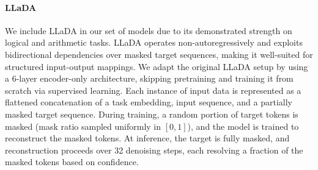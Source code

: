 \paragraph{LLaDA}
We include LLaDA \citep{Nie_LLaDA_2025} in our set of models due to its demonstrated strength on logical and arithmetic tasks. LLaDA operates non-autoregressively and exploits bidirectional dependencies over masked target sequences, making it well-suited for structured input-output mappings. We adapt the original LLaDA setup by using a 6-layer encoder-only architecture, skipping pretraining and training it from scratch via supervised learning. Each instance of input data is represented as a flattened concatenation of a task embedding, input sequence, and a partially masked target sequence. During training, a random portion of target tokens is masked (mask ratio sampled uniformly in $[0,1]$), and the model is trained to reconstruct the masked tokens. At inference, the target is fully masked, and reconstruction proceeds over 32 denoising steps, each resolving a fraction of the masked tokens based on confidence.




